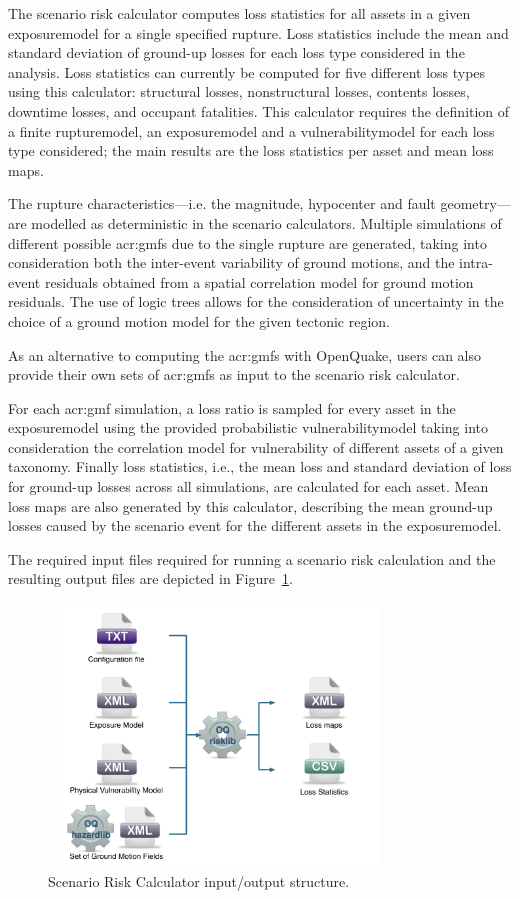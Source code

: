 The scenario risk calculator computes loss statistics for all \glspl{asset} in
a given \gls{exposuremodel} for a single specified \gls{rupture}.
Loss statistics include the mean and standard deviation of ground-up losses
for each loss type considered in the analysis. Loss
statistics can currently be computed for five different loss types using this
calculator: structural losses, nonstructural losses, contents losses, downtime
losses, and occupant fatalities. This calculator requires the definition of a
finite \gls{rupturemodel}, an \gls{exposuremodel} and a
\gls{vulnerabilitymodel} for each loss type considered; the main results are
the loss statistics per \gls{asset} and mean loss maps.

The \gls{rupture} characteristics---i.e. the magnitude, hypocenter and fault
geometry---are modelled as deterministic in the scenario calculators. Multiple
simulations of different possible \glspl{acr:gmf} due to the single
\gls{rupture} are generated, taking into consideration both the inter-event
variability of ground motions, and the intra-event residuals obtained from a
spatial correlation model for ground motion residuals. The use of logic trees
allows for the consideration of uncertainty in the choice of a ground motion
model for the given tectonic region.

As an alternative to computing the \glspl{acr:gmf} with OpenQuake, users can
also provide their own sets of \glspl{acr:gmf} as input to the scenario risk
calculator.

For each \gls{acr:gmf} simulation, a loss ratio is sampled for every asset in
the \gls{exposuremodel} using the provided probabilistic
\gls{vulnerabilitymodel} taking into consideration the correlation model for
vulnerability of different \glspl{asset} of a given taxonomy. Finally loss
statistics, i.e., the mean loss and standard deviation of loss for
ground-up losses across all simulations, are calculated
for each \gls{asset}. Mean loss maps are also generated by this calculator,
describing the mean ground-up losses caused by the
scenario event for the different assets in the \gls{exposuremodel}.

The required input files required for running a scenario risk calculation and
the resulting output files are depicted in Figure~\ref{fig:io-structure-scenario-risk}.

\begin{figure}[ht]
\centering
\includegraphics[width=9cm,height=7cm]{figures/risk/io-structure-scenario-risk.pdf}
\caption{Scenario Risk Calculator input/output structure.}
\label{fig:io-structure-scenario-risk}
\end{figure}
